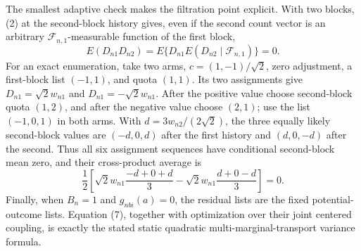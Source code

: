 The smallest adaptive check makes the filtration point explicit. With two blocks, (2) at the second-block history gives, even if the second count vector is an arbitrary \(\mathcal F_{n,1}\)-measurable function of the first block,
\[
E(D_{n1}D_{n2})=E\{D_{n1}E(D_{n2}\mid\mathcal F_{n,1})\}=0.
\tag{10}
\]
For an exact enumeration, take two arms, \(c=(1,-1)/\sqrt2\), zero adjustment, a first-block list \((-1,1)\), and quota \((1,1)\). Its two assignments give \(D_{n1}=\sqrt2w_{n1}\) and \(D_{n1}=-\sqrt2w_{n1}\). After the positive value choose second-block quota \((1,2)\), and after the negative value choose \((2,1)\); use the list \((-1,0,1)\) in both arms. With \(d=3w_{n2}/(2\sqrt2)\), the three equally likely second-block values are \((-d,0,d)\) after the first history and \((d,0,-d)\) after the second. Thus all six assignment sequences have conditional second-block mean zero, and their cross-product average is
\[
\frac12\left[\sqrt2w_{n1}\frac{-d+0+d}{3}
-\sqrt2w_{n1}\frac{d+0-d}{3}\right]=0.
\tag{11}
\]
Finally, when \(B_n=1\) and \(g_{nbi}(a)=0\), the residual lists are the fixed potential-outcome lists. Equation (7), together with optimization over their joint centered coupling, is exactly the stated static quadratic multi-marginal-transport variance formula.